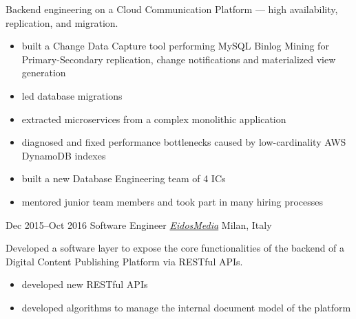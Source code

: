 \begin{entrylist}
Backend engineering on a Cloud Communication Platform --- high availability, replication, and migration.
\vspace{-.2cm}
\begin{itemize}[leftmargin=.6cm]
	\item built a Change Data Capture tool performing MySQL Binlog Mining for Primary-Secondary replication, change notifications and materialized view generation
	\item led database migrations
	\item extracted microservices from a complex monolithic application
	\item diagnosed and fixed performance bottlenecks caused by low-cardinality AWS DynamoDB indexes
	\item built a new Database Engineering team of 4 ICs
	\item mentored junior team members and took part in many hiring processes
\end{itemize}

\entry
{Dec 2015--Oct 2016}
{Software Engineer {\normalfont \emph{\href{https://www.eidosmedia.com/}{EidosMedia}}}}
{Milan, Italy}
{Developed a software layer to expose the core functionalities of the backend of a Digital Content Publishing Platform via RESTful APIs.  
\vspace{-.2cm}
\begin{itemize}[leftmargin=.6cm] 
	\item developed new RESTful APIs  
	\item developed algorithms to manage the internal document model of the platform
\end{itemize}
}


\end{entrylist}
